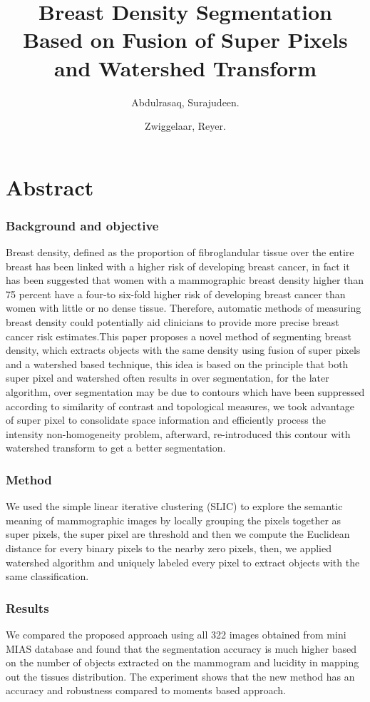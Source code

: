 \documentclass{article}
\date{}
\author[*]{Abdulrasaq, Surajudeen.}
\author[**]{Zwiggelaar, Reyer.}
\affil[*]{Center for Innovative Technology, Kwara State University, Nigeria, surajrasaq@gmail.com}
\affil[**]{Department of Computer Science, Aberystwyth University, Aberystwyth SY23 3DB, UK.}
\title{Breast Density Segmentation Based on Fusion of Super Pixels and Watershed Transform}
\begin{document}
	

 
	
\maketitle

\section*{Abstract}

\subsubsection*{Background and objective}
Breast density, defined as the proportion of fibroglandular tissue over the entire breast has been linked with a higher risk of developing breast cancer, in fact it has been suggested that women with a mammographic breast density higher than 75 percent have a four-to six-fold higher risk of developing breast cancer than women with little or no dense tissue. Therefore, automatic methods of measuring breast density could potentially aid clinicians to provide more precise breast cancer risk estimates.This paper proposes a novel method of segmenting breast density, which extracts objects with the same density using fusion of super pixels and a watershed based technique, this idea is based on the principle that both super pixel and watershed often results in over segmentation, for the later algorithm, over segmentation may be due to contours which have been suppressed according to similarity of contrast and topological measures, we took advantage of super pixel to consolidate space information and efficiently process the intensity non-homogeneity problem, afterward, re-introduced this contour with watershed transform to get a better segmentation.
\subsubsection*{Method}
We used the simple linear iterative clustering (SLIC) to explore the semantic meaning of mammographic images by locally grouping the pixels together as
super pixels, the super pixel are threshold and then we compute the Euclidean distance for every binary pixels to the nearby zero pixels, then, we applied watershed algorithm and uniquely labeled every pixel to extract objects with the same classification.
\subsubsection*{Results}
 We compared the proposed approach using all 322 images obtained from mini MIAS database and found that the segmentation accuracy is much higher based on the number of objects extracted on the mammogram and lucidity in mapping out the tissues distribution. The experiment shows that the new method has an accuracy and robustness compared to moments based approach.
 
\end{document}
